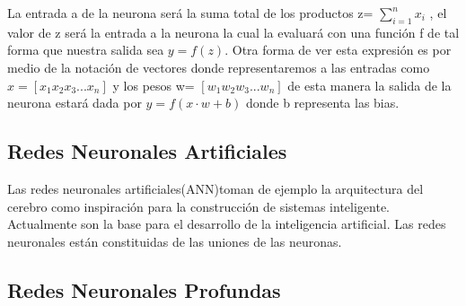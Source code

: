 La entrada a de la neurona será la suma total de los productos z=  $\sum_{i=1}^{n}x_{i}$ , el valor de z será la entrada a la neurona la cual la evaluará con una función f de tal forma que nuestra salida sea $y=f(z)$. Otra forma de ver esta expresión es por medio de la notación de vectores donde representaremos a las entradas como $x= [x_{1}  x_{2}  x_{3}  ...  x_{n}]$ y los pesos w= $[w_{1}  w_{2}  w_{3}  ...  w_{n}]$ de esta manera la salida de la neurona estará dada por $y=f(x\cdot w+b)$ donde b representa las bias. 

\subsection*{Redes Neuronales Artificiales}
Las redes neuronales artificiales(ANN)toman de ejemplo la arquitectura del cerebro como inspiración para la construcción de sistemas inteligente. Actualmente son la base para el desarrollo de la inteligencia artificial. Las redes neuronales están constituidas de las uniones de las neuronas. 
\subsection*{Redes Neuronales Profundas}


